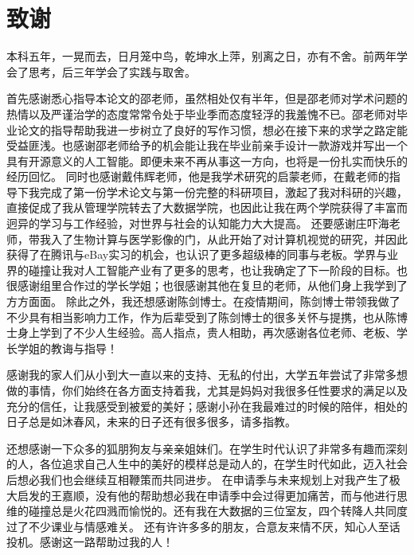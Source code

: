 \chapter*{致谢}
本科五年，一晃而去，日月笼中鸟，乾坤水上萍，别离之日，亦有不舍。前两年学会了思考，后三年学会了实践与取舍。

首先感谢悉心指导本论文的邵老师，虽然相处仅有半年，但是邵老师对学术问题的热情以及严谨治学的态度常常令处于毕业季而态度轻浮的我羞愧不已。邵老师对毕业论文的指导帮助我进一步树立了良好的写作习惯，想必在接下来的求学之路定能受益匪浅。也感谢邵老师给予的机会能让我在毕业前亲手设计一款游戏并写出一个具有开源意义的人工智能。即便未来不再从事这一方向，也将是一份扎实而快乐的经历回忆。
同时也感谢戴伟辉老师，他是我学术研究的启蒙老师，在戴老师的指导下我完成了第一份学术论文与第一份完整的科研项目，激起了我对科研的兴趣，直接促成了我从管理学院转去了大数据学院，也因此让我在两个学院获得了丰富而迥异的学习与工作经验，对世界与社会的认知能力大大提高。
还要感谢庄吓海老师，带我入了生物计算与医学影像的门，从此开始了对计算机视觉的研究，并因此获得了在腾讯与eBay实习的机会，也认识了更多超级棒的同事与老板。学界与业界的碰撞让我对人工智能产业有了更多的思考，也让我确定了下一阶段的目标。也很感谢组里合作过的学长学姐；也很感谢其他在复旦的老师，从他们身上我学到了方方面面。
除此之外，我还想感谢陈剑博士。在疫情期间，陈剑博士带领我做了不少具有相当影响力工作，作为后辈受到了陈剑博士的很多关怀与提携，也从陈博士身上学到了不少人生经验。高人指点，贵人相助，再次感谢各位老师、老板、学长学姐的教诲与指导！

感谢我的家人们从小到大一直以来的支持、无私的付出，大学五年尝试了非常多想做的事情，你们始终在各方面支持着我，尤其是妈妈对我很多任性要求的满足以及充分的信任，让我感受到被爱的美好；感谢小孙在我最难过的时候的陪伴，相处的日子总是如沐春风，未来的日子还有很多很多，请多指教。

还想感谢一下众多的狐朋狗友与亲亲姐妹们。在学生时代认识了非常多有趣而深刻的人，各位追求自己人生中的美好的模样总是动人的，在学生时代如此，迈入社会后想必我们也会继续互相鞭策而共同进步。
在申请季与未来规划上对我产生了极大启发的王嘉顺，没有他的帮助想必我在申请季中会过得更加痛苦，而与他进行思维的碰撞总是火花四溅而愉悦的。还有我在大数据的三位室友，四个转降人共同度过了不少课业与情感难关。
还有许许多多的朋友，合意友来情不厌，知心人至话投机。感谢这一路帮助过我的人！
